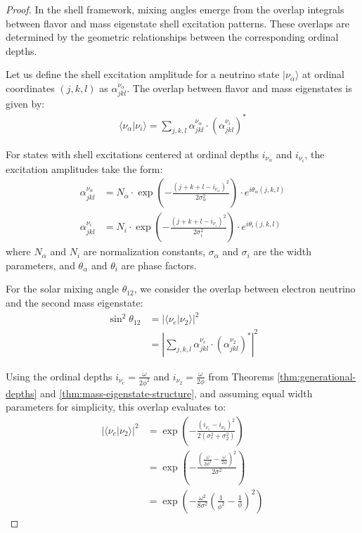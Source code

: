 \documentclass[12pt,a4paper]{article}
\begin{document}
\begin{proof}
In the shell framework, mixing angles emerge from the overlap integrals between flavor and mass eigenstate shell excitation patterns. These overlaps are determined by the geometric relationships between the corresponding ordinal depths.

Let us define the shell excitation amplitude for a neutrino state $|\nu_\alpha\rangle$ at ordinal coordinates $(j,k,l)$ as $\alpha_{jkl}^{\nu_\alpha}$. The overlap between flavor and mass eigenstates is given by:
\begin{align}
\langle \nu_\alpha | \nu_i \rangle = \sum_{j,k,l} \alpha_{jkl}^{\nu_\alpha} \cdot (\alpha_{jkl}^{\nu_i})^*
\end{align}

For states with shell excitations centered at ordinal depths $i_{\nu_\alpha}$ and $i_{\nu_i}$, the excitation amplitudes take the form:
\begin{align}
\alpha_{jkl}^{\nu_\alpha} &= N_\alpha \cdot \exp\left(-\frac{(j+k+l-i_{\nu_\alpha})^2}{2\sigma_\alpha^2}\right) \cdot e^{i\theta_\alpha(j,k,l)} \\
\alpha_{jkl}^{\nu_i} &= N_i \cdot \exp\left(-\frac{(j+k+l-i_{\nu_i})^2}{2\sigma_i^2}\right) \cdot e^{i\theta_i(j,k,l)}
\end{align}
where $N_\alpha$ and $N_i$ are normalization constants, $\sigma_\alpha$ and $\sigma_i$ are the width parameters, and $\theta_\alpha$ and $\theta_i$ are phase factors.

For the solar mixing angle $\theta_{12}$, we consider the overlap between electron neutrino and the second mass eigenstate:
\begin{align}
\sin^2\theta_{12} &= |\langle \nu_e | \nu_2 \rangle|^2 \\
&= \left|\sum_{j,k,l} \alpha_{jkl}^{\nu_e} \cdot (\alpha_{jkl}^{\nu_2})^*\right|^2
\end{align}

Using the ordinal depths $i_{\nu_e} = \frac{\omega}{2\phi^2}$ and $i_{\nu_2} = \frac{\omega}{2\phi}$ from Theorems \ref{thm:generational-depths} and \ref{thm:mass-eigenstate-structure}, and assuming equal width parameters for simplicity, this overlap evaluates to:
\begin{align}
|\langle \nu_e | \nu_2 \rangle|^2 &= \exp\left(-\frac{(i_{\nu_e}-i_{\nu_2})^2}{2(\sigma_e^2+\sigma_2^2)}\right) \\
&= \exp\left(-\frac{\left(\frac{\omega}{2\phi^2}-\frac{\omega}{2\phi}\right)^2}{2\sigma^2}\right) \\
&= \exp\left(-\frac{\omega^2}{8\sigma^2}\left(\frac{1}{\phi^2}-\frac{1}{\phi}\right)^2\right)
\end{align}


\end{proof}
\end{document}
